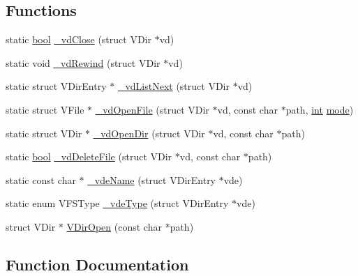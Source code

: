 \subsection*{Functions}
\begin{DoxyCompactItemize}
\item 
static \mbox{\hyperlink{libretro_8h_a4a26dcae73fb7e1528214a068aca317e}{bool}} \mbox{\hyperlink{vfs-dirent_8c_a4db83fb68c14cbfd915859885902b17b}{\+\_\+vd\+Close}} (struct V\+Dir $\ast$vd)
\item 
static void \mbox{\hyperlink{vfs-dirent_8c_ac13693dbfa8a872101cf5d88b66ab87f}{\+\_\+vd\+Rewind}} (struct V\+Dir $\ast$vd)
\item 
static struct V\+Dir\+Entry $\ast$ \mbox{\hyperlink{vfs-dirent_8c_a1bce38da5091375ead1437ed86074c0e}{\+\_\+vd\+List\+Next}} (struct V\+Dir $\ast$vd)
\item 
static struct V\+File $\ast$ \mbox{\hyperlink{vfs-dirent_8c_af98a3b7223717a0c978ed248a6f0310b}{\+\_\+vd\+Open\+File}} (struct V\+Dir $\ast$vd, const char $\ast$path, \mbox{\hyperlink{ioapi_8h_a787fa3cf048117ba7123753c1e74fcd6}{int}} \mbox{\hyperlink{ioapi_8h_a7e43d41c2fe013a373b540cba02505cf}{mode}})
\item 
static struct V\+Dir $\ast$ \mbox{\hyperlink{vfs-dirent_8c_a9d6bc6a6c2255b69ab39ee64c4da8456}{\+\_\+vd\+Open\+Dir}} (struct V\+Dir $\ast$vd, const char $\ast$path)
\item 
static \mbox{\hyperlink{libretro_8h_a4a26dcae73fb7e1528214a068aca317e}{bool}} \mbox{\hyperlink{vfs-dirent_8c_aa33820d98e66f15533027d25a4aa76ca}{\+\_\+vd\+Delete\+File}} (struct V\+Dir $\ast$vd, const char $\ast$path)
\item 
static const char $\ast$ \mbox{\hyperlink{vfs-dirent_8c_a13ca1b5e641080df5395524454ec2dd1}{\+\_\+vde\+Name}} (struct V\+Dir\+Entry $\ast$vde)
\item 
static enum V\+F\+S\+Type \mbox{\hyperlink{vfs-dirent_8c_a81778a0511632136f6bfb33d00cba047}{\+\_\+vde\+Type}} (struct V\+Dir\+Entry $\ast$vde)
\item 
struct V\+Dir $\ast$ \mbox{\hyperlink{vfs-dirent_8c_a2966065604f0fcfa278b5246d4d653b9}{V\+Dir\+Open}} (const char $\ast$path)
\end{DoxyCompactItemize}


\subsection{Function Documentation}
\mbox{\label{vfs-dirent_8c_a4db83fb68c14cbfd915859885902b17b}} 
